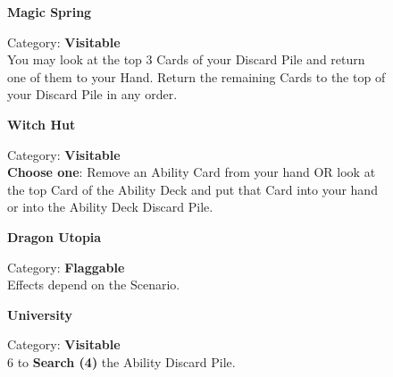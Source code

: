 \begin{figure}[H]
  \begin{minipage}[t]{0.47\textwidth}
    \vspace{0pt}
    \centering
    \textbf{Magic Spring}\par
    \caption{\small Category: \textbf{Visitable}\\
      You may look at the top 3 Cards of your Discard Pile and return one of them to your Hand.
      Return the remaining Cards to the top of your Discard Pile in any order.}
  \end{minipage}\hfill
  \begin{minipage}[t]{0.47\textwidth}
    \vspace{0pt}
    \centering
    \phantom{j}\textbf{Witch Hut}\par
    \caption{\small Category: \textbf{Visitable}\\
      \textbf{Choose one}: Remove an Ability Card from your hand OR look at the top Card of the Ability Deck and put that Card into your hand or into the Ability Deck Discard Pile.}
  \end{minipage}
\end{figure}

\begin{figure}[H]
  \begin{minipage}[t]{0.47\textwidth}
    \vspace{0pt}
    \centering
    \textbf{Dragon Utopia}\par
    \caption{\small Category: \textbf{Flaggable}\\Effects depend on the Scenario.}
  \end{minipage}\hfill
  \begin{minipage}[t]{0.47\textwidth}
    \vspace{0pt}
    \centering
    \textbf{University}\par
    \caption{\small Category: \textbf{Visitable}\\
       6  to \textbf{Search (4)} the Ability Discard Pile.}
  \end{minipage}
\end{figure}

